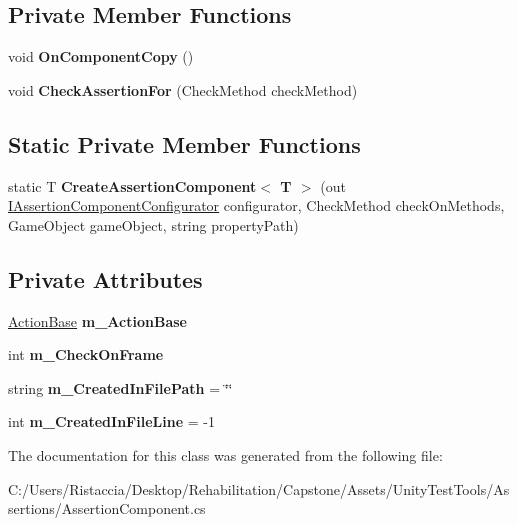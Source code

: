 \subsection*{Private Member Functions}
\begin{DoxyCompactItemize}
\item 
\mbox{\label{class_unity_test_1_1_assertion_component_af957762c23a4ee2aca9493f10e159c86}} 
void {\bfseries On\+Component\+Copy} ()
\item 
\mbox{\label{class_unity_test_1_1_assertion_component_ab169d98b019b839af87edf41b69ad3eb}} 
void {\bfseries Check\+Assertion\+For} (Check\+Method check\+Method)
\end{DoxyCompactItemize}
\subsection*{Static Private Member Functions}
\begin{DoxyCompactItemize}
\item 
\mbox{\label{class_unity_test_1_1_assertion_component_a0abefb99b52672feec930db37ac67a40}} 
static T {\bfseries Create\+Assertion\+Component$<$ T $>$} (out \hyperlink{interface_unity_test_1_1_i_assertion_component_configurator}{I\+Assertion\+Component\+Configurator} configurator, Check\+Method check\+On\+Methods, Game\+Object game\+Object, string property\+Path)
\end{DoxyCompactItemize}
\subsection*{Private Attributes}
\begin{DoxyCompactItemize}
\item 
\mbox{\label{class_unity_test_1_1_assertion_component_ae214a72324110ae6f3b795e18156fecd}} 
\hyperlink{class_unity_test_1_1_action_base}{Action\+Base} {\bfseries m\+\_\+\+Action\+Base}
\item 
\mbox{\label{class_unity_test_1_1_assertion_component_a76a46fd365fff83c27c6e3cf0b0049b6}} 
int {\bfseries m\+\_\+\+Check\+On\+Frame}
\item 
\mbox{\label{class_unity_test_1_1_assertion_component_a72c8ad5628bac4d1ea2663ce3991e74d}} 
string {\bfseries m\+\_\+\+Created\+In\+File\+Path} = \char`\"{}\char`\"{}
\item 
\mbox{\label{class_unity_test_1_1_assertion_component_a4971c4a97e54d5958fdb630c3d4ce448}} 
int {\bfseries m\+\_\+\+Created\+In\+File\+Line} = -\/1
\end{DoxyCompactItemize}


The documentation for this class was generated from the following file\+:\begin{DoxyCompactItemize}
\item 
C\+:/\+Users/\+Ristaccia/\+Desktop/\+Rehabilitation/\+Capstone/\+Assets/\+Unity\+Test\+Tools/\+Assertions/Assertion\+Component.\+cs\end{DoxyCompactItemize}
